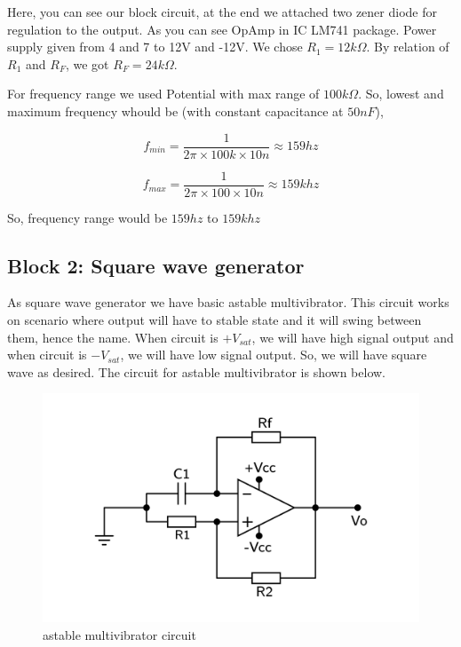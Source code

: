 \documentclass{article}
\begin{document}
Here, you can see our block circuit, at the end we attached two zener diode for regulation to the output. As you can see OpAmp in IC LM741 package. Power supply given from  4 and 7 to 12V and -12V. We chose \(R_{1}=12k\Omega\). By relation of \(R_{1}\) and \(R_{F}\), we got \(R_{F}=24k\Omega\).

For frequency range we used Potential with max range of \(100k\Omega\). So, lowest and maximum frequency whould be (with constant capacitance at \(50nF\)),

\begin{equation*}
\label{eq:orgc93e10d}
  f_{min} = \frac{1}{2\pi\times100k\times 10n} \approx 159 hz
\end{equation*}

\begin{equation*}
\label{eq:org3dc594a}
  f_{max} = \frac{1}{2\pi\times100\times 10n} \approx 159k hz
\end{equation*}

So, frequency range would be \(159 hz\) to \(159k hz\)


\subsection{Block 2: Square wave generator}
\label{sec:org59d6b8a}

As square wave generator we have basic astable multivibrator. This circuit works on scenario where output will have to stable state and it will swing between them, hence the name. When circuit is \(+V_{sat}\), we will have high signal output and when circuit is \(-V_{sat}\), we will have low signal output. So, we will have square wave as desired. The circuit for astable multivibrator is shown below.

\begin{figure}[htbp]
\centering
\includegraphics[width=0.8 \textwidth]{imgs/square.png}
\caption{\label{fig:org619c2cb}astable multivibrator circuit}
\end{figure}
\end{document}
